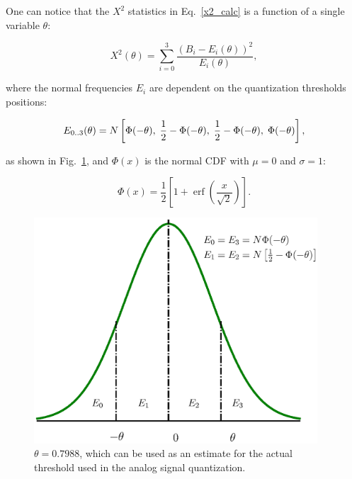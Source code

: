 \documentclass[letterpaper,twoside,12pt]{article}
\newcommand{\twodots}{\mathinner {\ldotp \ldotp}}
\DeclareMathOperator\erf{erf}
\begin{document}
One can notice that the $X^2$ statistics in Eq.~\eqref{x2_calc} is a function of a single variable $\theta$: 

\begin{equation}
  \label{x2_func_of_theta}
  X^2(\theta) = \sum_{i=0}^3 \frac{(B_i - E_i(\theta))^2}{E_i(\theta)},
\end{equation}

where the normal frequencies $E_i$ are dependent on the quantization thresholds positions:

\begin{equation*}
  \label{norm_freq}
  E_{0\twodots3}(\theta) = N \left[\Phi(-\theta), \; \frac{1}{2}-\Phi(-\theta), \; 
                             \frac{1}{2}-\Phi(-\theta), \; \Phi(-\theta) \right],
\end{equation*}

as shown in Fig.~\ref{npdf_areas}, and $\Phi(x)$ is the normal CDF with $\mu=0$ and $\sigma=1$:

\begin{equation}
  \label{ncdf}
  \Phi(x) = \frac{1}{2} \left[1 + \erf \left( \frac{x}{\sqrt{2}} \right) \right].
\end{equation}


\begin{figure}[ht!]
  \begin{center}
  \includegraphics[width=25pc]{fig_npdf_areas.eps}
  \caption{\small  $\theta = 0.7988$, which can be used as an estimate for the actual threshold used in the analog signal quantization.}
  \label{npdf_areas}
  \end{center}
\end{figure}
\end{document}

